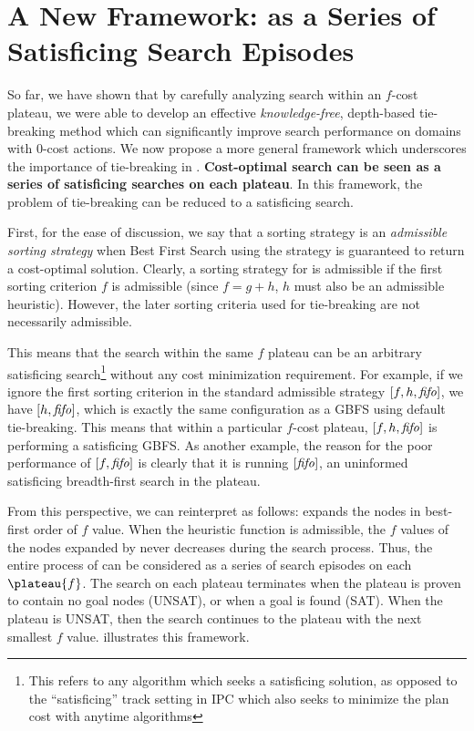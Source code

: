 \clearpage 
\section{A New Framework:  \astar as a Series of Satisficing Search Episodes}
\label{sec:discussion}

So far, we have shown that by carefully analyzing search within an $f$-cost plateau,
we were able to develop an effective
{\it knowledge-free}, depth-based tie-breaking method which can significantly improve search performance on domains with 0-cost actions.
We now propose a more general framework which underscores the importance of tie-breaking in \astar.
\textbf{Cost-optimal search
can be seen as a series of satisficing searches on each plateau}. In this framework, the problem of tie-breaking can be
reduced to a satisficing search.

First, for the ease of discussion, 
we say that a sorting strategy is an \emph{admissible sorting strategy}
when Best First Search using the strategy is guaranteed to return a cost-optimal solution.
Clearly, a sorting strategy for \astar is admissible if %
the first sorting criterion $f$ is admissible (since $f=g+h$, $h$ must also be an admissible heuristic).
However, the later sorting criteria used for tie-breaking are not necessarily admissible.

This means that the search within the same $f$ plateau can be an arbitrary  satisficing search\footnote{This refers to any algorithm which seeks a satisficing solution, as opposed to the ``satisficing'' track setting in IPC which also seeks to minimize the plan cost with anytime algorithms} without any cost minimization requirement. For example,
if we ignore the first sorting criterion in the standard admissible strategy
$[f,h,{\text{\textit{fifo}}}]$, we have $[h,{\text{\textit{fifo}}}]$, which is exactly
the same configuration as a GBFS using \fifo default tie-breaking. This 
means that within a particular $f$-cost plateau, $[f,h,{\text{\textit{fifo}}}]$ is
performing a satisficing GBFS.
As another example, the reason for the poor performance of $[f,{\text{\textit{fifo}}}]$
is clearly that it is running $[{\text{\textit{fifo}}}]$,
an uninformed satisficing breadth-first search in the plateau.

From this perspective, we can reinterpret \astar as follows: \astar expands the nodes in best-first order of $f$ value. When the
heuristic function is admissible, the $f$ values of the nodes expanded by \astar never decreases during the
search process.
Thus, the entire process of \astar can be considered as a series of search episodes on each $\plateau{f}$.
The search on each plateau terminates when the plateau is proven to contain no goal nodes (UNSAT), or when a goal is found (SAT).
When the plateau is UNSAT, then the search continues to the plateau with the next smallest $f$ value.
 illustrates this framework.

